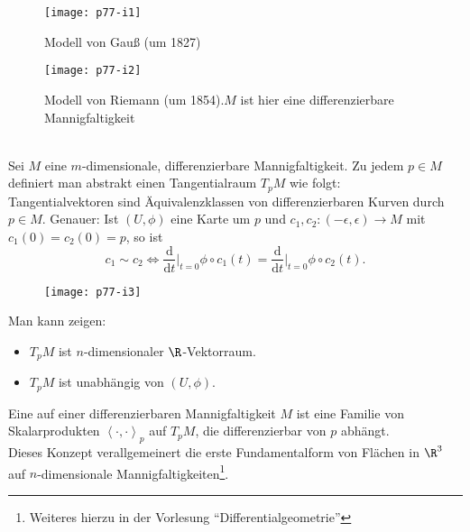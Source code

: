 \begin{minipage}{.475\textwidth}
  \begin{figure}[H]
    \texttt{[image: p77-i1]}
    \caption{Modell von Gauß (um 1827)}
  \end{figure}
\end{minipage}
\hfill
\begin{minipage}{.475\textwidth}
  \begin{figure}[H]
    \texttt{[image: p77-i2]}
    \vspace{1em}
    \caption{Modell von Riemann (um 1854).\enskip \( M \) ist hier eine differenzierbare Mannigfaltigkeit}
  \end{figure}
\end{minipage}

\ \\

Sei \( M \) eine \( m \)-dimensionale, differenzierbare Mannigfaltigkeit. Zu jedem \( p \in M \) definiert man abstrakt einen Tangentialraum \( T_p M \) wie folgt: \\
Tangentialvektoren sind Äquivalenzklassen von differenzierbaren Kurven durch \( p \in M \). Genauer: Ist \( (U, \phi) \) eine Karte um \( p \) und \( c_1, c_2: (-\epsilon, \epsilon) \to M \) mit \( c_1(0) = c_2(0) = p \), so ist
\begin{equation*}
  c_1 \sim c_2 \Leftrightarrow \frac{\text{d}}{\text{d}t}\vert_{t = 0} \phi \circ c_1(t) = \frac{\text{d}}{\text{d}t}\vert_{t = 0} \phi \circ c_2(t)\text{.}
\end{equation*}

\begin{figure}[H]
  \texttt{[image: p77-i3]}
\end{figure}

Man kann zeigen:
\begin{itemize}
  \item \( T_p M \) ist \( n \)-dimensionaler \( \R \)-Vektorraum.
  \item \( T_p M \) ist unabhängig von \( (U, \phi) \).
\end{itemize}

\begin{definition}
  Eine  auf einer differenzierbaren Mannigfaltigkeit \( M \) ist eine Familie von Skalarprodukten \( \left\langle \cdot,\cdot \right\rangle_p \) auf \( T_p M \), die differenzierbar von \( p \) abhängt. \\
  Dieses Konzept verallgemeinert die erste Fundamentalform von Flächen in \( \R^3 \) auf \( n \)-dimensionale Mannigfaltigkeiten\footnote{Weiteres hierzu in der Vorlesung ``Differentialgeometrie''}.
\end{definition}

